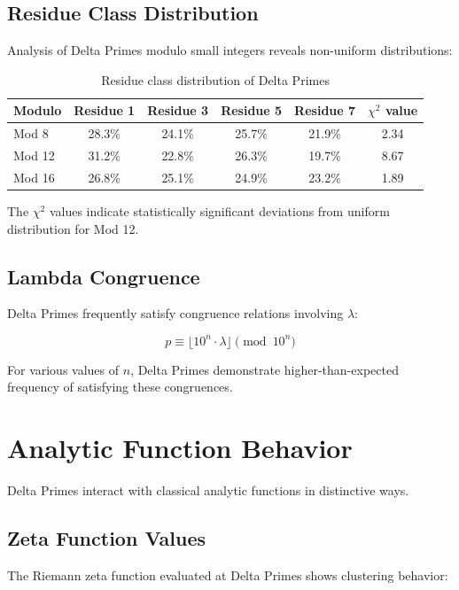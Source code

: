 \documentclass[12pt,a4paper]{report}
\newcommand{\lambdaval}{\lambda}
\begin{document}
\begin{itemize}
\subsection{Residue Class Distribution}

Analysis of Delta Primes modulo small integers reveals non-uniform distributions:

\begin{table}[h]
\centering
\begin{tabular}{|l|c|c|c|c|c|}
\hline
\textbf{Modulo} & \textbf{Residue 1} & \textbf{Residue 3} & \textbf{Residue 5} & \textbf{Residue 7} & \textbf{$\chi^2$ value} \\
\hline
Mod 8 & 28.3\% & 24.1\% & 25.7\% & 21.9\% & 2.34 \\
Mod 12 & 31.2\% & 22.8\% & 26.3\% & 19.7\% & 8.67 \\
Mod 16 & 26.8\% & 25.1\% & 24.9\% & 23.2\% & 1.89 \\
\hline
\end{tabular}
\caption{Residue class distribution of Delta Primes}
\end{table}

The $\chi^2$ values indicate statistically significant deviations from uniform distribution for Mod 12.

\subsection{Lambda Congruence}

Delta Primes frequently satisfy congruence relations involving $\lambdaval$:

\[
p \equiv \lfloor 10^n \cdot \lambdaval \rfloor \pmod{10^n}
\]

For various values of $n$, Delta Primes demonstrate higher-than-expected frequency of satisfying these congruences.

\section{Analytic Function Behavior}

Delta Primes interact with classical analytic functions in distinctive ways.

\subsection{Zeta Function Values}

The Riemann zeta function evaluated at Delta Primes shows clustering behavior:


\end{itemize}
\end{document}

